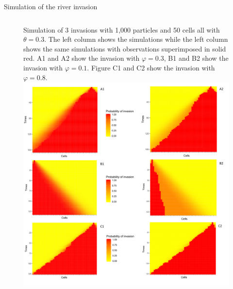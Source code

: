 \documentclass[9pt, xcolor={dvipsnames,svgnames,table}]{beamer}
\begin{document}
\begin{frame}{Simulation of the river invasion}
    \begin{figure}
        \begin{columns}
            Simulation of 3 invasions with 1,000 particles and 50 cells all with $\theta = 0.3$. The left column shows the simulations while the left column shows the same simulations with observations superimposed in solid red. A1 and A2 show the invasion with $\varphi = 0.3$, B1 and B2 show the invasion with $\varphi = 0.1$. Figure C1 and C2 show the invasion with $\varphi = 0.8$.
            \label{fig:2}
            \includegraphics[width=\textwidth]{Thesis/river_007.png}
        \end{columns}
    \end{figure}
\end{frame}
\end{document}
